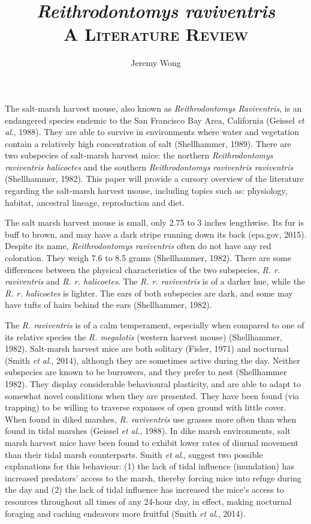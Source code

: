 \documentclass[a4paper]{article}
\author{Jeremy Wong}
\title{\textit{Reithrodontomys raviventris}\\ \textsc{A Literature Review}}
\begin{document}
\maketitle

The salt-marsh harvest mouse, also known as \textit{Reithrodontomys Raviventris}, is an endangered species endemic to the San Francisco Bay Area, California (Geissel \textit{et al}., 1988). They are able to survive in environments where water and vegetation contain a relatively high concentration of salt (Shellhammer, 1989). There are two subspecies of salt-marsh harvest mice: the northern \textit{Reithrodontomys raviventris halicoetes} and the southern \textit{Reithrodontomys raviventris raviventris} (Shellhammer, 1982). This paper will provide a cursory overview of the literature regarding the salt-marsh harvest mouse, including topics such as: physiology, habitat, ancestral lineage, reproduction and diet.

The salt marsh harvest mouse is small, only 2.75 to 3 inches lengthwise. Its fur is buff to brown, and may have a dark stripe running down its back (epa.gov, 2015). Despite its name, \textit{Reithrodontomys raviventris} often do not have any red coloration. They weigh 7.6 to 8.5 grams (Shellhammer, 1982). There are some differences between the physical characteristics of the two subspecies, \textit{R. r. raviventris} and \textit{R. r. halicoetes}. The \textit{R. r. raviventris} is of a darker hue, while the \textit{R. r. halicoetes} is lighter. The ears of both subspecies are dark, and some may have tufts of hairs behind the ears (Shellhammer, 1982).

The \textit{R. raviventris} is of a calm temperament, especially when compared to one of its relative species the \textit{R. megalotis} (western harvest mouse) (Shellhammer, 1982). Salt-marsh harvest mice are both solitary (Fisler, 1971) and nocturnal (Smith \textit{et al}., 2014), although they are sometimes active during the day. Neither subspecies are known to be burrowers, and they prefer to nest (Shellhammer 1982). They display considerable behavioural plasticity, and are able to adapt to somewhat novel conditions when they are presented. They have been found (via trapping) to be willing to traverse expanses of open ground with little cover. When found in diked marshes, \textit{R. raviventris} use grasses more often than when found in tidal marshes (Geissel \textit{et al}., 1988). In dike marsh environments, salt marsh harvest mice have been found to exhibit lower rates of diurnal movement than their tidal marsh counterparts. Smith \textit{et al}., suggest two possible explanations for this behaviour: (1) the lack of tidal influence (inundation) has increased predators' access to the marsh, thereby forcing mice into refuge during the day and (2) the lack of tidal influence has increased the mice's access to resources throughout all times of any 24-hour day, in effect, making nocturnal foraging and caching endeavors more fruitful (Smith \textit{et al}., 2014).
\end{document}
